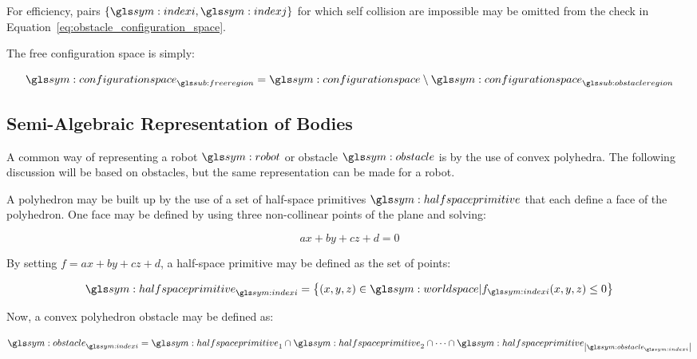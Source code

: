 		For efficiency, pairs $\{\indexi, \indexj\}$ for which self collision
		are impossible may be omitted from the check in
		Equation~\ref{eq:obstacle_configuration_space}.

		The free configuration space is simply:

		\begin{equation}
			\configurationspace_{\freeregion} = \configurationspace \setminus
				\configurationspace_{\obstacleregion}
		\end{equation}

	\subsection{Semi-Algebraic Representation of Bodies}%
	\label{sec:semi_algebraic_representation_of_bodies}

		A common way of representing a robot $\robot$ or obstacle $\obstacle$ is
		by the use of convex polyhedra. The following discussion will be based
		on obstacles, but the same representation can be made for a robot.

		A polyhedron may be built up by the use of a set of half-space
		primitives $\halfspaceprimitive$ that each define a face of the
		polyhedron. One face may be defined by using three non-collinear points
		of the plane and solving:

		\begin{equation}
			ax + by + cz + d = 0
		\end{equation}

		By setting
		\(
			f = ax + by +cz + d
		\),
		a half-space primitive may be defined as the set of points:

		\begin{equation}
			\halfspaceprimitive_{\indexi} =
				\left\{
					(x,y,z) \in \world |
					f_{\indexi}(x,y,z) \leq 0
				\right\}
				\label{eq:half_space_primitive}
		\end{equation}

		Now, a convex polyhedron obstacle may be
		defined as:

		\begin{equation}
			\obstacle_{\indexi} =
				\halfspaceprimitive_1 \cap \halfspaceprimitive_2 \cap \cdots \cap
				\halfspaceprimitive_{\cardinality{\obstacle_{\indexi}}}
				\label{eq:convex_obstacle}
		\end{equation}

